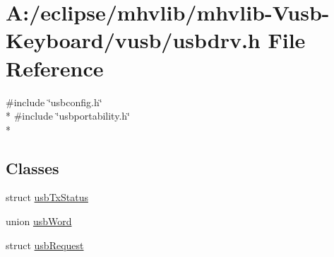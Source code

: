 \hypertarget{mhvlib-_vusb-_keyboard_2vusb_2usbdrv_8h}{\section{A\-:/eclipse/mhvlib/mhvlib-\/\-Vusb-\/\-Keyboard/vusb/usbdrv.h File Reference}
\label{mhvlib-_vusb-_keyboard_2vusb_2usbdrv_8h}
}
{\ttfamily \#include \char`\"{}usbconfig.\-h\char`\"{}}\\*
{\ttfamily \#include \char`\"{}usbportability.\-h\char`\"{}}\\*
\subsection*{Classes}
\begin{DoxyCompactItemize}
\item 
struct \hyperlink{structusb_tx_status}{usb\-Tx\-Status}
\item 
union \hyperlink{unionusb_word}{usb\-Word}
\item 
struct \hyperlink{structusb_request}{usb\-Request}
\end{DoxyCompactItemize}
